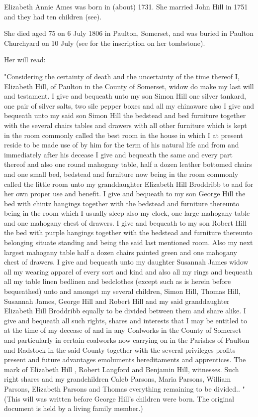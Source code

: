 
Elizabeth Annie Ames was born in (about) 1731.  She married John Hill in 1751 and they had ten children (see).

She died aged 75 on 6 July 1806 in Paulton, Somerset, and was buried in Paulton Churchyard on 10 July (see for the inscription on her tombstone).

Her will read:

 "Considering the certainty of death and the uncertainty of the time thereof I, Elizabeth Hill, of Paulton in the County of Somerset, widow do make my last will and testament. I give and bequeath unto my son Simon Hill one silver tankard, one pair of silver salts, two sile pepper boxes and all my chinaware also I give and bequeath unto my said son Simon Hill the bedstead and bed furniture together with the several chairs tables and drawers with all other furniture which is kept in the room commonly called the best room in the house in which I at present reside to be made use of by him for the term of his natural life and from and immediately after his decease I give and bequeath the same and every part thereof and also one round mahogany table, half a dozen leather bottomed chairs and one small bed, bedstead and furniture now being in the room commonly called the little room unto my granddaughter Elizabeth Hill Broddribb to and for her own proper use and benefit. I give and bequeath to my son George Hill the bed with chintz hangings together with the bedstead and furniture thereunto being in the room which I usually sleep also my clock, one large mahogany table and one mahogany chest of drawers. I give and bequeath to my son Robert Hill the bed with purple hangings together with the bedstead and furniture thereunto belonging situate standing and being the said last mentioned room. Also my next largest mahogany table half a dozen chairs painted green and one mahogany chest of drawers. I give and bequeath unto my daughter Susannah James widow all my wearing apparel of every sort and kind and also all my rings and bequeath all my table linen bedlinen and bedclothes (except such as is herein before bequeathed) unto and amongst my several children, Simon Hill, Thomas Hill, Susannah James, George Hill and Robert Hill and my said granddaughter Elizabeth Hill Broddribb equally to be divided between them and share alike. I give and bequeath all such rights, shares and interests that I may be entitled to at the time of my decease of and in any Coalworks in the County of Somerset and particularly in certain coalworks now carrying on in the Parishes of Paulton and Radstock in the said County together with the several privileges profits present and future advantages emoluments hereditaments and apprentices. The mark of Elizabeth Hill , Robert Langford and Benjamin Hill, witnesses. Such right shares and my grandchildren Caleb Parsons, Maria Parsons, William Parsons, Elizabeth Parsons and Thomas everything remaining to be divided.. "  (This will was written before George Hill's children were born. The original document is held by a living family member.)

